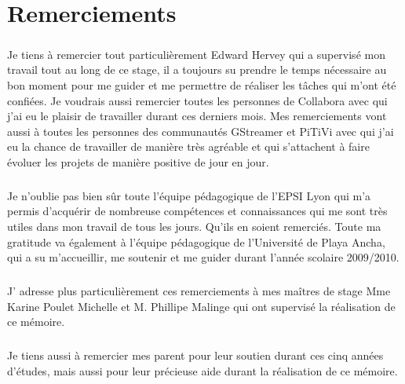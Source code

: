 \newpage \chapter*{Remerciements}

\paragraph {}

Je tiens à remercier tout particulièrement Edward Hervey qui a
supervisé mon travail tout au long de ce stage, il a toujours su prendre
le temps nécessaire au bon moment pour me guider et me permettre
de réaliser les tâches qui m'ont été confiées.
Je voudrais aussi remercier toutes les personnes de Collabora
avec qui j'ai eu le plaisir de travailler durant ces derniers mois.
Mes remerciements vont aussi à toutes les personnes des communautés GStreamer
et PiTiVi avec qui j'ai eu la chance de travailler de manière très
agréable et qui s'attachent à faire évoluer les projets de manière
positive de jour en jour.

\paragraph {}

Je n'oublie pas bien sûr toute l'équipe pédagogique de l'EPSI Lyon
qui m'a permis d'acquérir de nombreuse compétences et connaissances
qui me sont très utiles dans mon travail de tous les jours. Qu'ils en soient remerciés.
Toute ma gratitude va également à l'équipe pédagogique de l'Université de Playa Ancha,
qui a su m'accueillir, me soutenir et me guider durant l'année scolaire 2009/2010.

\paragraph {}

J' adresse plus particulièrement ces remerciements à mes maîtres de
stage Mme Karine Poulet Michelle et M. Phillipe Malinge qui ont
supervisé la réalisation de ce mémoire.

\paragraph {}

Je tiens aussi à remercier mes parent pour leur soutien durant ces
cinq années d'études, mais aussi pour leur précieuse aide durant la
réalisation de ce mémoire.
